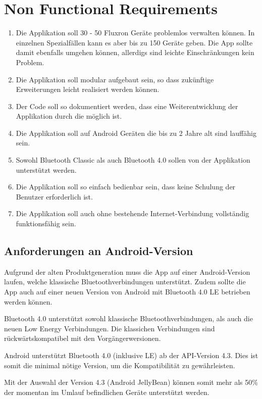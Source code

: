
\section{Non Functional Requirements}
\label{sec:Non Functional Requirements}

\begin{enumerate}
\item Die Applikation soll 30 - 50 Fluxron Geräte problemlos verwalten können. In einzelnen Spezialfällen kann es aber bis zu 150 Geräte geben. Die App sollte damit ebenfalls umgehen können, allerdigs sind leichte Einschränkungen kein Problem.
\item Die Applikation soll modular aufgebaut sein, so dass zukünftige Erweiterungen leicht realisiert werden können.
\item Der Code soll so dokumentiert werden, dass eine Weiterentwicklung der Applikation durch die \fluxron{} möglich ist.
\item Die Applikation soll auf Android Geräten die bis zu 2 Jahre alt sind lauffähig sein.
\item Sowohl Bluetooth Classic als auch Bluetooth 4.0 sollen von der Applikation unterstützt werden.
\item Die Applikation soll so einfach bedienbar sein, dass keine Schulung der Benutzer erforderlich ist.
\item Die Applikation soll auch ohne bestehende Internet-Verbindung vollständig funktionsfähig sein.
\end{enumerate}


\subsection{Anforderungen an Android-Version}
\label{subsec:Non Functional Requirements}
Aufgrund der alten Produktgeneration muss die App auf einer Android-Version laufen, welche klassische Bluetoothverbindungen unterstützt. Zudem sollte die App auch auf einer neuen Version von Android mit Bluetooth 4.0 \ac{LE} betrieben werden können.

Bluetooth 4.0 unterstützt sowohl klassische Bluetoothverbindungen, als auch die neuen Low Energy Verbindungen. Die klassichen Verbindungen sind rückwärtskompatibel mit den Vorgängerwersionen.\cite{bt_standard}

Android unterstützt Bluetooth 4.0 (inklusive \ac{LE}) ab der API-Version 4.3\cite{bt_android}. Dies ist somit die minimal nötige Version, um die Kompatibilität zu gewährleisten.

Mit der Auswahl der Version 4.3 (Android JellyBean) können somit mehr als 50\% der momentan im Umlauf \cite{android_distribution} befindlichen Geräte unterstützt werden.